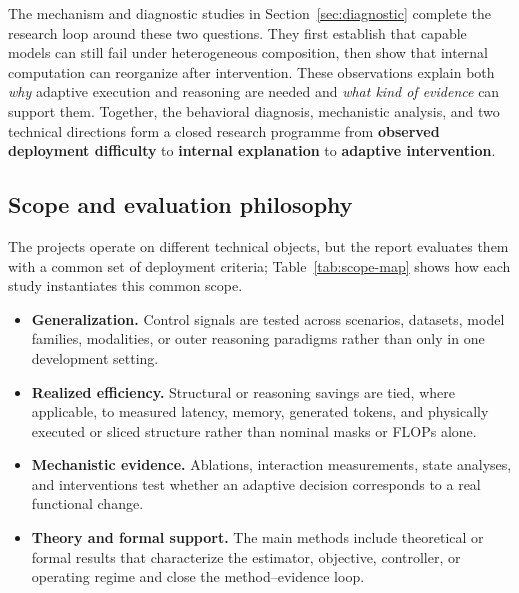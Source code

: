 \documentclass[12pt,a4paper]{article}
\begin{document}
The mechanism and diagnostic studies in Section~\ref{sec:diagnostic} complete the research loop around these two questions. They first establish that capable models can still fail under heterogeneous composition, then show that internal computation can reorganize after intervention. These observations explain both \emph{why} adaptive execution and reasoning are needed and \emph{what kind of evidence} can support them. Together, the behavioral diagnosis, mechanistic analysis, and two technical directions form a closed research programme from \textbf{observed deployment difficulty} to \textbf{internal explanation} to \textbf{adaptive intervention}.

\subsection{Scope and evaluation philosophy}

The projects operate on different technical objects, but the report evaluates them with a common set of deployment criteria; Table~\ref{tab:scope-map} shows how each study instantiates this common scope.
\begin{itemize}[leftmargin=1.35em,itemsep=0.08em]
  \item \textbf{Generalization.} Control signals are tested across scenarios, datasets, model families, modalities, or outer reasoning paradigms rather than only in one development setting.
  \item \textbf{Realized efficiency.} Structural or reasoning savings are tied, where applicable, to measured latency, memory, generated tokens, and physically executed or sliced structure rather than nominal masks or FLOPs alone.
  \item \textbf{Mechanistic evidence.} Ablations, interaction measurements, state analyses, and interventions test whether an adaptive decision corresponds to a real functional change.
  \item \textbf{Theory and formal support.} The main methods include theoretical or formal results that characterize the estimator, objective, controller, or operating regime and close the method--evidence loop.
\end{itemize}
\end{document}
